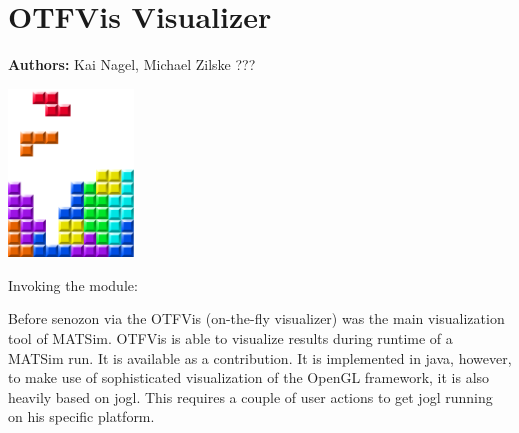 \chapter{OTFVis Visualizer}
\label{ch:otfvis}

\hfill \textbf{Authors:} Kai Nagel, Michael Zilske ???

\begin{center} \includegraphics[width=0.25\textwidth, angle=0]{figures/MATSimBook.png} \end{center}


\begin{compactitem}
\item Invoking the module: 
\end{compactitem}

Before senozon via the OTFVis (on-the-fly visualizer) \citep[][]{Strippgen_PhDThesis_2009} was the main visualization tool of MATSim. OTFVis is able to visualize results during runtime of a MATSim run. It is available as a contribution. It is implemented in java, however, to make use of sophisticated visualization of the OpenGL framework, it is also heavily based on jogl. This requires a couple of user actions to get jogl running on his specific platform. 







